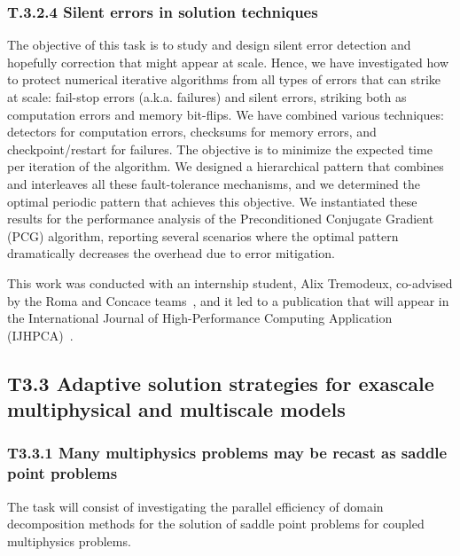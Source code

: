 \subsubsection{ 
T.3.2.4 Silent errors in solution techniques
}
 The objective of this task is to study and design silent
error detection and hopefully correction that might appear at scale.  
Hence, we have investigated how to protect numerical iterative algorithms from all types of errors that can strike at scale: fail-stop errors (a.k.a. failures) and silent errors, striking both as computation errors
 and memory bit-flips. We have combined various techniques: detectors for computation errors,
  checksums for memory errors,  and checkpoint/restart for failures.  The objective is to minimize the expected time per iteration of the algorithm. We designed a hierarchical pattern that combines and interleaves all these fault-tolerance mechanisms, and we determined
  the optimal periodic pattern that achieves this objective. We instantiated these results for the performance analysis of the Preconditioned Conjugate Gradient (PCG) algorithm, reporting several scenarios where the optimal pattern dramatically decreases the overhead due to error mitigation.

  This work was conducted with an internship student, Alix Tremodeux, co-advised by the Roma and Concace teams~\cite{tremodeux:hal-04872041}, and it led to a publication that will appear in the International Journal of High-Performance Computing Application (IJHPCA)~\cite{tremodeux:hal-05234063}.

 
 \subsection{ 
T3.3 Adaptive solution strategies for exascale multiphysical and multiscale models
 }

\subsubsection{ 
 T3.3.1 Many multiphysics problems may be recast as saddle point problems
 }
 \label{sec:wp3:T331}
  The task will consist of investigating the parallel efficiency of domain decomposition methods for the solution of saddle point problems for coupled multiphysics problems.


